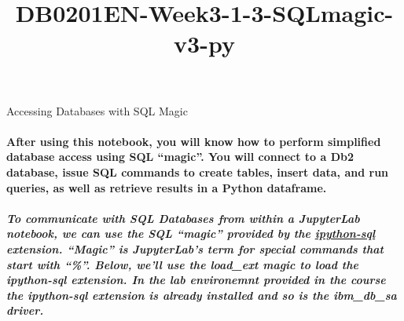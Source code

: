 \documentclass[11pt]{article}
\title{DB0201EN-Week3-1-3-SQLmagic-v3-py}
\begin{document}
    
    \maketitle
    
    

    
    Accessing Databases with SQL Magic

    \hypertarget{after-using-this-notebook-you-will-know-how-to-perform-simplified-database-access-using-sql-magic.-you-will-connect-to-a-db2-database-issue-sql-commands-to-create-tables-insert-data-and-run-queries-as-well-as-retrieve-results-in-a-python-dataframe.}{%
\paragraph{After using this notebook, you will know how to perform
simplified database access using SQL ``magic''. You will connect to a
Db2 database, issue SQL commands to create tables, insert data, and run
queries, as well as retrieve results in a Python
dataframe.}\label{after-using-this-notebook-you-will-know-how-to-perform-simplified-database-access-using-sql-magic.-you-will-connect-to-a-db2-database-issue-sql-commands-to-create-tables-insert-data-and-run-queries-as-well-as-retrieve-results-in-a-python-dataframe.}}

    \hypertarget{to-communicate-with-sql-databases-from-within-a-jupyterlab-notebook-we-can-use-the-sql-magic-provided-by-the-ipython-sql-extension.-magic-is-jupyterlabs-term-for-special-commands-that-start-with-.-below-well-use-the-load_ext-magic-to-load-the-ipython-sql-extension.-in-the-lab-environemnt-provided-in-the-course-the-ipython-sql-extension-is-already-installed-and-so-is-the-ibm_db_sa-driver.}{%
\subparagraph{\texorpdfstring{To communicate with SQL Databases from
within a JupyterLab notebook, we can use the SQL ``magic'' provided by
the \href{https://github.com/catherinedevlin/ipython-sql}{ipython-sql}
extension. ``Magic'' is JupyterLab's term for special commands that
start with ``\%''. Below, we'll use the \emph{load}\_\emph{ext} magic to
load the ipython-sql extension. In the lab environemnt provided in the
course the ipython-sql extension is already installed and so is the
ibm\_db\_sa
driver.}{To communicate with SQL Databases from within a JupyterLab notebook, we can use the SQL ``magic'' provided by the ipython-sql extension. ``Magic'' is JupyterLab's term for special commands that start with ``\%''. Below, we'll use the load\_ext magic to load the ipython-sql extension. In the lab environemnt provided in the course the ipython-sql extension is already installed and so is the ibm\_db\_sa driver.}}\label{to-communicate-with-sql-databases-from-within-a-jupyterlab-notebook-we-can-use-the-sql-magic-provided-by-the-ipython-sql-extension.-magic-is-jupyterlabs-term-for-special-commands-that-start-with-.-below-well-use-the-load_ext-magic-to-load-the-ipython-sql-extension.-in-the-lab-environemnt-provided-in-the-course-the-ipython-sql-extension-is-already-installed-and-so-is-the-ibm_db_sa-driver.}}
\end{document}
